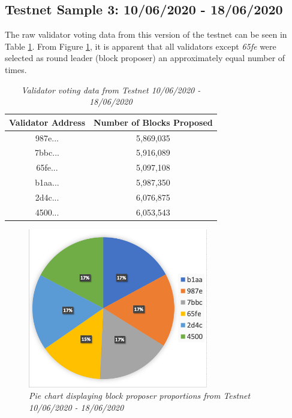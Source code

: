 \documentclass[12pt,openany,a4paper]{book}
\begin{document}
\subsection{Testnet Sample 3: 10/06/2020 - 18/06/2020}
The raw validator voting data from this version of the testnet can be seen in Table 
\ref{validator_table_3}. From Figure \ref{validator_pie_3}, it is apparent that all 
validators except \textit{65fe} were selected as round leader (block proposer) an 
approximately equal number of times.
\begin{table}[h!]
    \caption{\sl Validator voting data from Testnet 10/06/2020 - 18/06/2020}
    \label{validator_table_3}
\begin{center}
\begin{tabular}{ |c|c| } 
    \hline
    Validator Address & Number of Blocks Proposed \\
    \hline
    \hline
    987e... & 5,869,035 \\
    \hline
    7bbc... & 5,916,089 \\
    \hline
    65fe... & 5,097,108 \\
    \hline
    b1aa... & 5,987,350 \\
    \hline
    2d4c... & 6,076,875 \\
    \hline
    4500... & 6,053,543 \\
    \hline
\end{tabular}
\end{center}
\end{table}

\begin{figure}[h]
    \caption{\sl Pie chart displaying block proposer proportions from Testnet 10/06/2020 - 18/06/2020}
    \label{validator_pie_3}
    \begin{center}
    \includegraphics[width=0.7\textwidth]{imgs/testnet_validator_pie_3.png}
    \end{center}
\end{figure}
\end{document}
